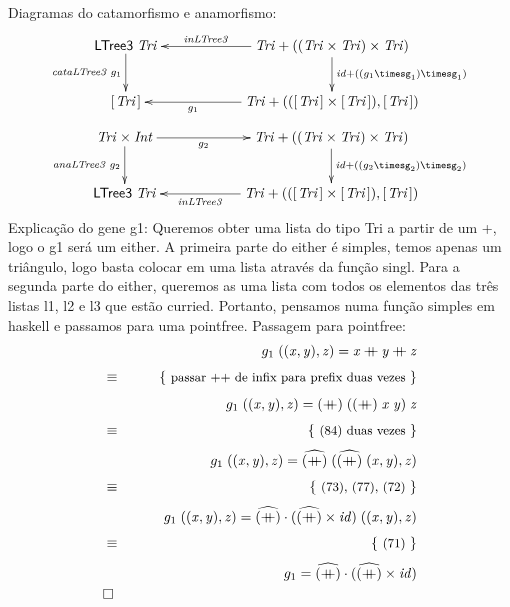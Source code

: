 \documentclass[a4paper]{article}
\newcommand{\Conid}[1]{\mathit{#1}}
\newcommand{\Varid}[1]{\mathit{#1}}
\begin{document}
Diagramas do catamorfismo e anamorfismo:
\begin{eqnarray*}
\xymatrix@C=2cm{
    \ensuremath{\mathsf{LTree3}\;\Conid{Tri}}
           \ar[d]_-{\ensuremath{\Varid{cataLTree3}\;g_1 }}
&
    \ensuremath{\Conid{Tri}\mathbin{+}((\Conid{Tri}\times\Conid{Tri})\times\Conid{Tri})}
           \ar[d]^{\ensuremath{\Varid{id}\mathbin{+}((g_1 \timesg_1 )\timesg_1 )}}
           \ar[l]_-{\ensuremath{\Varid{inLTree3}}}
\\
     \ensuremath{[\mskip1.5mu \Conid{Tri}\mskip1.5mu]}
&
     \ensuremath{\Conid{Tri}\mathbin{+}(([\mskip1.5mu \Conid{Tri}\mskip1.5mu]\times[\mskip1.5mu \Conid{Tri}\mskip1.5mu]),[\mskip1.5mu \Conid{Tri}\mskip1.5mu])}
           \ar[l]^-{\ensuremath{g_1 }}
}

\end{eqnarray*}
\begin{eqnarray*}
\xymatrix@C=2cm{
    \ensuremath{\Conid{Tri}\times\Conid{Int}}
           \ar[r]_-{\ensuremath{g_2 }}
           \ar[d]_-{\ensuremath{\Varid{anaLTree3}\;g_2 }}
&
    \ensuremath{\Conid{Tri}\mathbin{+}((\Conid{Tri}\times\Conid{Tri})\times\Conid{Tri})}
           \ar[d]^{\ensuremath{\Varid{id}\mathbin{+}((g_2 \timesg_2 )\timesg_2 )}}
\\
     \ensuremath{\mathsf{LTree3}\;\Conid{Tri}}
&
     \ensuremath{\Conid{Tri}\mathbin{+}(([\mskip1.5mu \Conid{Tri}\mskip1.5mu]\times[\mskip1.5mu \Conid{Tri}\mskip1.5mu]),[\mskip1.5mu \Conid{Tri}\mskip1.5mu])}
           \ar[l]^-{\ensuremath{\Varid{inLTree3}}}
}
\end{eqnarray*}
Explicação do gene g1:
Queremos obter uma lista do tipo Tri a partir de um +, logo o g1 será um either.
A primeira parte do either é simples, temos apenas um triângulo, logo basta colocar em uma lista através da função singl.
Para a segunda parte do either, queremos as uma lista com todos os elementos das três listas l1, l2 e l3 que estão curried.
Portanto, pensamos numa função simples em haskell e passamos para uma pointfree.
Passagem para pointfree:
\begin{eqnarray*}
\start
     \ensuremath{g_1 \;((\Varid{x},\Varid{y}),\Varid{z})\mathrel{=}\Varid{x}\mathbin{+\!\!\!+}\Varid{y}\mathbin{+\!\!\!+}\Varid{z}} 
%
\just\equiv{passar ++ de infix para prefix duas vezes}
%
     \ensuremath{g_1 \;((\Varid{x},\Varid{y}),\Varid{z})\mathrel{=}(\mathbin{+\!\!\!+})\;((\mathbin{+\!\!\!+})\;\Varid{x}\;\Varid{y})\;\Varid{z}} 
%
\just\equiv{(84) duas vezes}
%
     \ensuremath{g_1 \;((\Varid{x},\Varid{y}),\Varid{z})\mathrel{=}\uncurry{(\mathbin{+\!\!\!+})}\;(\uncurry{(\mathbin{+\!\!\!+})}\;(\Varid{x},\Varid{y}),\Varid{z})} 
%
\just\equiv{(73), (77), (72)}
%
     \ensuremath{g_1 \;((\Varid{x},\Varid{y}),\Varid{z})\mathrel{=}\uncurry{(\mathbin{+\!\!\!+})}\comp (\uncurry{(\mathbin{+\!\!\!+})}\times\Varid{id})\;((\Varid{x},\Varid{y}),\Varid{z})} 
%
\just\equiv{(71)}
%
     \ensuremath{g_1 \mathrel{=}\uncurry{(\mathbin{+\!\!\!+})}\comp (\uncurry{(\mathbin{+\!\!\!+})}\times\Varid{id})} 
\qed
\end{eqnarray*}
\end{document}

